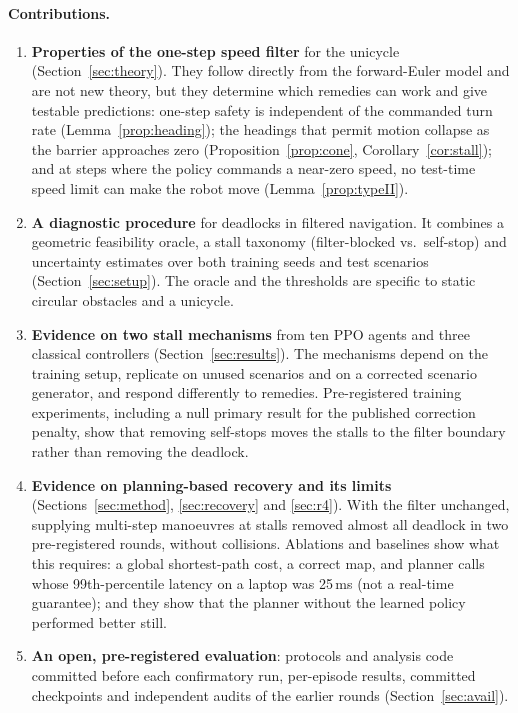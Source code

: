 \documentclass[11pt]{article}
\theoremstyle{definition}
\theoremstyle{remark}
\begin{document}
\paragraph{Contributions.}
\begin{enumerate}
  \item \textbf{Properties of the one-step speed filter} for the unicycle (Section~\ref{sec:theory}). They follow directly from the forward-Euler model and are not new theory, but they determine which remedies can work and give testable predictions: one-step safety is independent of the commanded turn rate (Lemma~\ref{prop:heading}); the headings that permit motion collapse as the barrier approaches zero (Proposition~\ref{prop:cone}, Corollary~\ref{cor:stall}); and at steps where the policy commands a near-zero speed, no test-time speed limit can make the robot move (Lemma~\ref{prop:typeII}).
  \item \textbf{A diagnostic procedure} for deadlocks in filtered navigation. It combines a geometric feasibility oracle, a stall taxonomy (filter-blocked vs.\ self-stop) and uncertainty estimates over both training seeds and test scenarios (Section~\ref{sec:setup}). The oracle and the thresholds are specific to static circular obstacles and a unicycle.
  \item \textbf{Evidence on two stall mechanisms} from ten PPO agents and three classical controllers (Section~\ref{sec:results}). The mechanisms depend on the training setup, replicate on unused scenarios and on a corrected scenario generator, and respond differently to remedies. Pre-registered training experiments, including a null primary result for the published correction penalty, show that removing self-stops moves the stalls to the filter boundary rather than removing the deadlock.
  \item \textbf{Evidence on planning-based recovery and its limits} (Sections~\ref{sec:method}, \ref{sec:recovery} and \ref{sec:r4}). With the filter unchanged, supplying multi-step manoeuvres at stalls removed almost all deadlock in two pre-registered rounds, without collisions. Ablations and baselines show what this requires: a global shortest-path cost, a correct map, and planner calls whose 99th-percentile latency on a laptop was 25\,ms (not a real-time guarantee); and they show that the planner without the learned policy performed better still.
  \item \textbf{An open, pre-registered evaluation}: protocols and analysis code committed before each confirmatory run, per-episode results, committed checkpoints and independent audits of the earlier rounds (Section~\ref{sec:avail}).
\end{enumerate}
\end{document}
